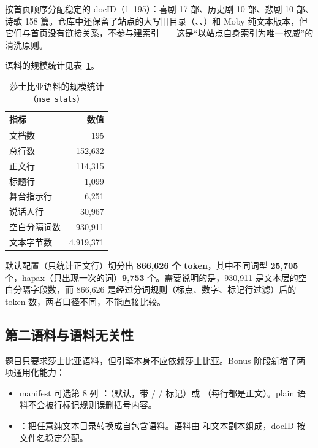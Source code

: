 按首页顺序分配稳定的 docID（1--195）：喜剧 17 部、历史剧 10 部、悲剧 10 部、诗歌 158 篇。仓库中还保留了站点的大写旧目录（、、）和 Moby 纯文本版本，但它们与首页没有链接关系，不参与建索引——这是“以站点自身索引为唯一权威”的清洗原则。

语料的规模统计见表~\ref{tab:corpus-stats}。

\begin{table}[htbp]
  \centering
  \caption{莎士比亚语料的规模统计（\texttt{mse stats}）}
  \label{tab:corpus-stats}
  \begin{tabularx}{\linewidth}{@{}Xr@{}}
    \toprule
    指标 & 数值 \\
    \midrule
    文档数 & 195 \\
    总行数 & 152,632 \\
    正文行 & 114,315 \\
    标题行 & 1,099 \\
    舞台指示行 & 6,251 \\
    说话人行 & 30,967 \\
    空白分隔词数 & 930,911 \\
    文本字节数 & 4,919,371 \\
    \bottomrule
  \end{tabularx}
\end{table}

默认配置（只统计正文行）切分出 \textbf{866,626 个 token}，其中不同词型 \textbf{25,705} 个，hapax（只出现一次的词）\textbf{9,753} 个。需要说明的是，930,911 是文本层的空白分隔字段数，而 866,626 是经过分词规则（标点、数字、标记行过滤）后的 token 数，两者口径不同，不能直接比较。

\subsection{第二语料与语料无关性}

题目只要求莎士比亚语料，但引擎本身不应依赖莎士比亚。Bonus 阶段新增了两项通用化能力：

\begin{itemize}
  \item manifest 可选第 8 列 ：（默认，带 \code{[标题]} /  /  标记）或 （每行都是正文）。plain 语料不会被行标记规则误删括号内容。
  \item {}：把任意纯文本目录转换成自包含语料。语料由  和文本副本组成，docID 按文件名稳定分配。
\end{itemize}

